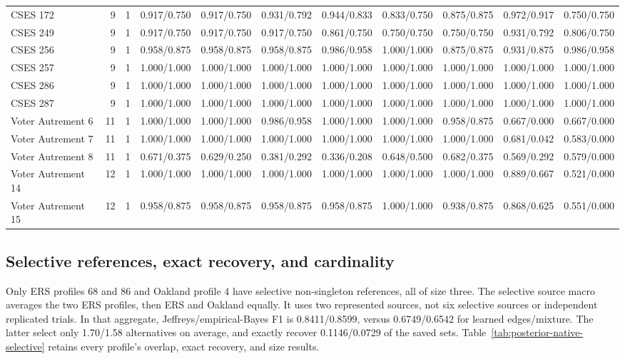 \begin{longtable}{@{}lrrllllllll@{}}
CSES 172 & 9 & 1 & 0.917/0.750 & 0.917/0.750 & 0.931/0.792 & 0.944/0.833 & 0.833/0.750 & 0.875/0.875 & 0.972/0.917 & 0.750/0.750\\
CSES 249 & 9 & 1 & 0.917/0.750 & 0.917/0.750 & 0.917/0.750 & 0.861/0.750 & 0.750/0.750 & 0.750/0.750 & 0.931/0.792 & 0.806/0.750\\
CSES 256 & 9 & 1 & 0.958/0.875 & 0.958/0.875 & 0.958/0.875 & 0.986/0.958 & 1.000/1.000 & 0.875/0.875 & 0.931/0.875 & 0.986/0.958\\
CSES 257 & 9 & 1 & 1.000/1.000 & 1.000/1.000 & 1.000/1.000 & 1.000/1.000 & 1.000/1.000 & 1.000/1.000 & 1.000/1.000 & 1.000/1.000\\
CSES 286 & 9 & 1 & 1.000/1.000 & 1.000/1.000 & 1.000/1.000 & 1.000/1.000 & 1.000/1.000 & 1.000/1.000 & 1.000/1.000 & 1.000/1.000\\
CSES 287 & 9 & 1 & 1.000/1.000 & 1.000/1.000 & 1.000/1.000 & 1.000/1.000 & 1.000/1.000 & 1.000/1.000 & 1.000/1.000 & 1.000/1.000\\
Voter Autrement 6 & 11 & 1 & 1.000/1.000 & 1.000/1.000 & 0.986/0.958 & 1.000/1.000 & 1.000/1.000 & 0.958/0.875 & 0.667/0.000 & 0.667/0.000\\
Voter Autrement 7 & 11 & 1 & 1.000/1.000 & 1.000/1.000 & 1.000/1.000 & 1.000/1.000 & 1.000/1.000 & 1.000/1.000 & 0.681/0.042 & 0.583/0.000\\
Voter Autrement 8 & 11 & 1 & 0.671/0.375 & 0.629/0.250 & 0.381/0.292 & 0.336/0.208 & 0.648/0.500 & 0.682/0.375 & 0.569/0.292 & 0.579/0.000\\
Voter Autrement 14 & 12 & 1 & 1.000/1.000 & 1.000/1.000 & 1.000/1.000 & 1.000/1.000 & 1.000/1.000 & 1.000/1.000 & 0.889/0.667 & 0.521/0.000\\
Voter Autrement 15 & 12 & 1 & 0.958/0.875 & 0.958/0.875 & 0.958/0.875 & 0.958/0.875 & 1.000/1.000 & 0.938/0.875 & 0.868/0.625 & 0.551/0.000\\
\end{longtable}\endgroup

\subsection{Selective references, exact recovery, and cardinality}
Only ERS profiles 68 and 86 and Oakland profile 4 have selective non-singleton references, all of size three. The selective source macro averages the two ERS profiles, then ERS and Oakland equally. It uses two represented sources, not six selective sources or independent replicated trials. In that aggregate, Jeffreys/empirical-Bayes F1 is 0.8411/0.8599, versus 0.6749/0.6542 for learned edges/mixture. The latter select only 1.70/1.58 alternatives on average, and exactly recover 0.1146/0.0729 of the saved sets. Table~\ref{tab:posterior-native-selective} retains every profile's overlap, exact recovery, and size results.

